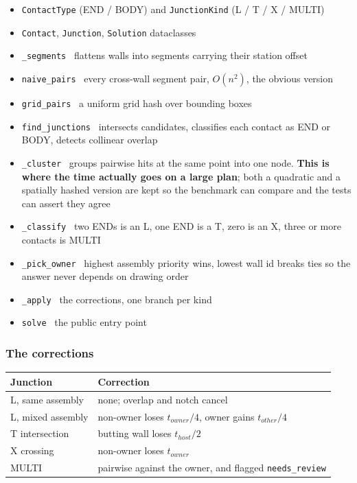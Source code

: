 \documentclass[11pt,letterpaper]{article}
\newcommand{\code}[1]{\texttt{\small #1}}
\begin{document}
\begin{itemize}
  \item \code{ContactType} (END / BODY) and \code{JunctionKind} (L / T / X / MULTI)
  \item \code{Contact}, \code{Junction}, \code{Solution} dataclasses
  \item \code{\_segments} \textendash\ flattens walls into segments carrying
    their station offset
  \item \code{naive\_pairs} \textendash\ every cross-wall segment pair,
    $O(n^2)$, the obvious version
  \item \code{grid\_pairs} \textendash\ a uniform grid hash over bounding boxes
  \item \code{find\_junctions} \textendash\ intersects candidates, classifies
    each contact as END or BODY, detects collinear overlap
  \item \code{\_cluster} \textendash\ groups pairwise hits at the same point
    into one node. \textbf{This is where the time actually goes on a large
    plan}; both a quadratic and a spatially hashed version are kept so the
    benchmark can compare and the tests can assert they agree
  \item \code{\_classify} \textendash\ two ENDs is an L, one END is a T, zero
    is an X, three or more contacts is MULTI
  \item \code{\_pick\_owner} \textendash\ highest assembly priority wins,
    lowest wall id breaks ties so the answer never depends on drawing order
  \item \code{\_apply} \textendash\ the corrections, one branch per kind
  \item \code{solve} \textendash\ the public entry point
\end{itemize}

\subsubsection{The corrections}

\begin{center}
\begin{tabular}{@{}lp{8.2cm}@{}}
\toprule
\textbf{Junction} & \textbf{Correction} \\
\midrule
L, same assembly & none; overlap and notch cancel \\
L, mixed assembly & non-owner loses $t_{owner}/4$, owner gains $t_{other}/4$ \\
T intersection & butting wall loses $t_{host}/2$ \\
X crossing & non-owner loses $t_{owner}$ \\
MULTI & pairwise against the owner, and flagged \code{needs\_review} \\
\bottomrule
\end{tabular}
\end{center}
\end{document}
